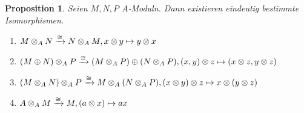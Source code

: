 \documentclass[12pt,a4paper]{scrartcl}
\theoremstyle{cplain}
\newtheorem{prop}[thmcounter]{Proposition}
\theoremstyle{cdef}
\begin{document}
\begin{prop}
	Seien $M,N,P$ $A$-Moduln. Dann existieren eindeutig bestimmte Isomorphismen.
	\begin{enumerate}
		\item $M \otimes_A N \xrightarrow{\cong} N \otimes_A M, x \otimes y \mapsto y \otimes x$ \label{prop:tensorisos:i}
		\item $(M \oplus N) \otimes_A P \xrightarrow{\cong} (M \otimes_A P) \oplus (N \otimes_A P), (x,y)\otimes z  \mapsto (x \otimes z,y\otimes z)$ \label{prop:tensorisos:ii}
		\item $(M \otimes_A N) \otimes_A P \xrightarrow{\cong} M \otimes_A (N \otimes_A P), (x \otimes y) \otimes z \mapsto x \otimes (y \otimes z)$ \label{prop:tensorisos:iii}
		\item $A \otimes_A M \xrightarrow{\cong} M, (a \otimes x) \mapsto ax$ \label{prop:tensorisos:iv}
	\end{enumerate}
\end{prop}

\end{document}
